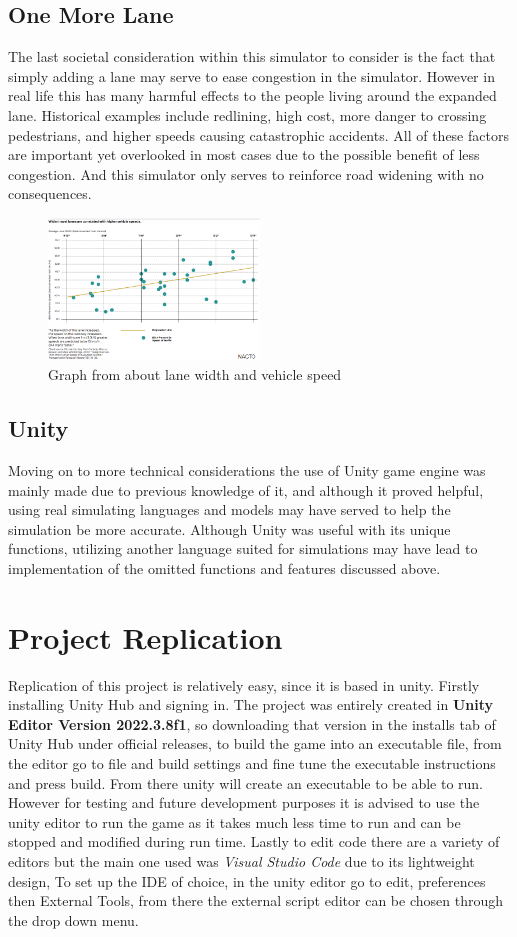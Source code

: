 \documentclass[10pt,twocolumn]{article}
\begin{document}
\subsection{One More Lane}
The last societal consideration within this simulator to consider is the fact that simply adding a lane may serve to ease congestion in the simulator. However in real life this has many harmful effects to the people living around the expanded lane. Historical examples include redlining, high cost, more danger to crossing pedestrians, and higher speeds causing catastrophic accidents. All of these factors are important yet overlooked in most cases due to the possible benefit of less congestion. And this simulator only serves to reinforce road widening with no consequences.
\begin{figure}[h]
\caption{Graph from \cite{StreetElementsToolbox} about lane width and vehicle speed}
\centering
\includegraphics[width=0.5\textwidth]{SpeedChat.png}
\end{figure}
\subsection{Unity}
Moving on to more technical considerations the use of Unity game engine was mainly made due to previous knowledge of it, and although it proved helpful, using real simulating languages and models may have served to help the simulation be more accurate. Although Unity was useful with its unique functions, utilizing another language suited for simulations may have lead to implementation of the omitted functions and features discussed above. 
\section{Project Replication}
Replication of this project is relatively easy, since it is based in unity. Firstly installing Unity Hub and signing in. The project was entirely created in \textbf{Unity Editor Version 2022.3.8f1}, so downloading that version in the installs tab of Unity Hub under official releases, to build the game into an executable file, from the editor go to file and build settings and fine tune the executable instructions and press build. From there unity will create an executable to be able to run. However for testing and future development purposes it is advised to use the unity editor to run the game as it takes much less time to run and can be stopped and modified during run time. Lastly to edit code there are a variety of editors but the main one used was \textit{Visual Studio Code} due to its lightweight design, To set up the IDE of choice, in the unity editor go to edit, preferences then External Tools, from there the external script editor can be chosen through the drop down menu.
\end{document}
